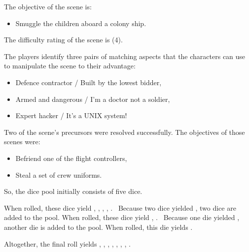 \documentclass[12pt, a5paper, parskip=half-, footheight=1.4cm]{scrartcl}
\begin{document}
The objective of the scene is:
\begin{itemize}[leftmargin=\widthof{\hspace{0.25cm}\textbullet\space}, noitemsep,topsep=-1ex]
\item Smuggle the children aboard a colony ship.
\end{itemize}
\vspace{1ex}
The difficulty rating of the scene is (4). 

The players identify three pairs of matching aspects that the characters can use to manipulate the scene to their advantage:
\begin{itemize}[leftmargin=\widthof{\hspace{0.25cm}\textbullet\space}, noitemsep, topsep=-1ex]
\item Defence contractor / Built by the lowest bidder,
\item Armed and dangerous / I'm a doctor not a soldier,
\item Expert hacker / It's a UNIX system!
\end{itemize}
\vspace{1ex}
Two of the scene's precursors were resolved successfully. The objectives of those scenes were:
\begin{itemize}[leftmargin=\widthof{\hspace{0.25cm}\textbullet\space}, nosep, topsep=-1ex]
\item Befriend one of the flight controllers,
\item Steal a set of crew uniforms.
\end{itemize}
\vspace{1ex}
So, the dice pool initially consists of five dice.

When rolled, these dice yield , , , ,  .%
\ Because two dice yielded , two dice are added to the pool.
When rolled, these dice yield , .%
\ Because one die yielded , another die is added to the pool.
When rolled, this die yields .

Altogether, the final roll yields , , , , , , , .%
\end{document}
